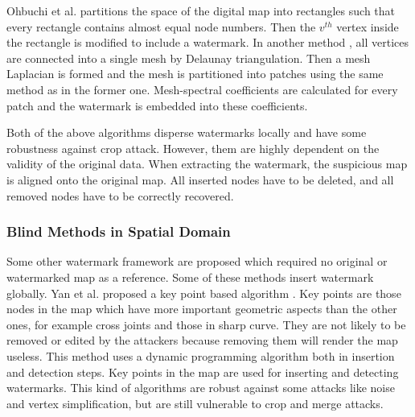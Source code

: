 Ohbuchi et al.\cite{OhbuchiUE02} partitions the space of the digital map 
into rectangles such that every rectangle contains almost equal node numbers. 
Then the $v^{th}$ vertex inside 
the rectangle is modified to include a watermark. In another method \cite{OhbuchiUE03}, 
all vertices are connected into a single mesh by Delaunay triangulation. 
Then a mesh Laplacian is formed and the mesh is partitioned into patches using 
the same method as in the former one\cite{OhbuchiUE02}. 
Mesh-spectral coefficients are calculated for every patch and the watermark is embedded into 
these coefficients. 

Both of the above algorithms disperse watermarks locally and have 
some robustness against crop attack. 
However, them are highly dependent on the validity of the original data. 
When extracting the watermark, the suspicious map is aligned onto the original map. 
All inserted nodes have to be deleted, and all removed nodes have to be correctly 
recovered.

\subsubsection{Blind Methods in Spatial Domain}
Some other watermark framework are proposed which required no original or watermarked map
as a reference. Some of these methods \cite{Huo10:Polyline,KangKC01,YanLW11,Spr:scheme} 
insert watermark globally. 
Yan et al. proposed a key point based algorithm \cite{YanLW11}. 
Key points are those nodes in the map which have more important geometric aspects 
than the other ones, for example cross joints and those in sharp curve. 
They are not likely to be removed or edited by the attackers because removing them
will render the map useless.  This method uses a dynamic programming 
algorithm \cite{DOUGLASD.H.:1973} both in insertion and detection steps. 
Key points in the map are used for inserting and detecting watermarks. 
This kind of algorithms are robust against some attacks like noise and vertex simplification, 
but are still vulnerable to crop and merge attacks.  %


